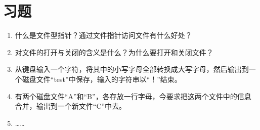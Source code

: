 \section{习题}
\begin{enumerate}
	\item 什么是文件型指针？通过文件指针访问文件有什么好处？
	\item 对文件的打开与关闭的含义是什么？为什么要打开和关闭文件？
	\item 从键盘输入一个字符，将其中的小写字母全部转换成大写字母，然后输出到一个磁盘文件“test”中保存，输入的字符串以“！”结束。
	\item 有两个磁盘文件“A”和“B”，各存放一行字母，今要求把这两个文件中的信息合并，输出到一个新文件“C”中去。
	\item ……
\end{enumerate}
